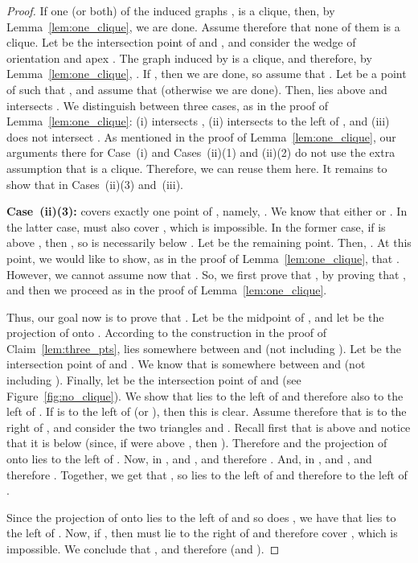 \documentclass[11pt]{article}
\begin{document}
\begin{proof}
If one (or both) of the induced graphs ,  is a clique, then, by Lemma~\ref{lem:one_clique}, we are done.
Assume therefore that none of them is a clique. 
Let  be the intersection point of  and , and consider the wedge  of orientation  and apex .
The graph induced by  is a clique, and therefore, by Lemma~\ref{lem:one_clique}, .
If , then we are done, so assume that .
Let  be a point of  such that , and assume that  (otherwise
we are done). Then,  lies above  and  intersects .
We distinguish between three cases, as in the proof of Lemma~\ref{lem:one_clique}:
(i)  intersects , (ii)  intersects  to the left of , and (iii)  does not intersect . 
As mentioned in the proof of Lemma~\ref{lem:one_clique}, our arguments there for Case~(i) and Cases~(ii)(1) and (ii)(2) do not use the extra assumption that  is a clique. Therefore, we can reuse them here. It remains to show that  in Cases~(ii)(3) and~(iii).  

{\bf Case~(ii)(3):}  covers exactly one point of , namely, . We know that either  or . In the latter case,  must also cover , which is impossible. In the former case, if  is above , then , so  is necessarily below .
Let  be the remaining point. Then, . 
At this point, we would like to show, as in the proof of Lemma~\ref{lem:one_clique}, that . However, we cannot assume now that . So, we first prove that , by proving that , and then we proceed as in the proof of Lemma~\ref{lem:one_clique}.



Thus, our goal now is to prove that . Let  be the midpoint of , and let  be the projection of  onto . According to the construction in the proof of Claim~\ref{lem:three_pts},  lies somewhere between  and  (not including ). Let  be the intersection point of  and . We know that  is somewhere between  and  (not including ). Finally, let  be the intersection point of  and  (see Figure~\ref{fig:no_clique}). We show that  lies to the left of  and therefore also to the left of . If  is to the left of  (or ), then this is clear. Assume therefore that  is to the right of , and consider the two triangles  and . Recall first that  is above  and notice that it is below  (since, if  were above , then ). Therefore  and the projection of  onto  lies to the left of . Now, in ,  and , and therefore . And, in ,  and , and therefore . Together, we get that , so  lies to the left of  and therefore to the left of .

Since the projection of  onto  lies to the left of  and so does , we have that  lies to the left of . Now, if , then  must lie to the right of  and therefore cover , which is impossible. We conclude that , and therefore  (and ). 


\end{proof}
\end{document}
